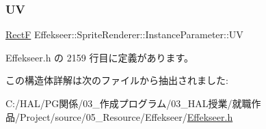 \subsubsection{\texorpdfstring{UV}{UV}}
{\footnotesize\ttfamily \mbox{\hyperlink{struct_effekseer_1_1_rect_f}{RectF}} Effekseer\+::\+Sprite\+Renderer\+::\+Instance\+Parameter\+::\+UV}



 Effekseer.\+h の 2159 行目に定義があります。



この構造体詳解は次のファイルから抽出されました\+:\begin{DoxyCompactItemize}
\item 
C\+:/\+H\+A\+L/\+P\+G関係/03\+\_\+作成プログラム/03\+\_\+\+H\+A\+L授業/就職作品/\+Project/source/05\+\_\+\+Resource/\+Effekseer/\mbox{\hyperlink{_effekseer_8h}{Effekseer.\+h}}\end{DoxyCompactItemize}
